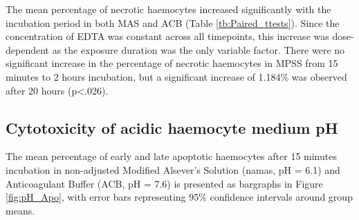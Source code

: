 The mean percentage of necrotic haemocytes increased significantly with the incubation period in both MAS and ACB (Table \ref{tb:Paired_ttests}). Since the concentration of EDTA was constant across all timepoints, this increase was dose-dependent as the exposure duration was the only variable factor. There were no significant increase in the percentage of necrotic haemocytes in MPSS from 15 minutes to 2 hours incubation, but a significant increase of 1.184\% was observed after 20 hours (p<.026).

\begin{table}[h!]
\centering
	\caption{Paired two-tailed t-tests were used to assess wether the percentages of necrotic haemocytes increased with incubation time within each group. The difference between means at t = 15 min, 2 hours and 20 hours are presented with 95\% confidence intervals and the belonging p-value.}
	\label{tb:Paired_ttests}
\end{table}


\subsection{Cytotoxicity of acidic haemocyte medium pH}
The mean percentage of early and late apoptotic haemocytes after 15 minutes incubation in non-adjusted Modified Alsever's Solution (\acrshort{namas}, pH = 6.1) and Anticoagulant Buffer (ACB, pH = 7.6) is presented as bargraphs in Figure \ref{fig:pH_Apo}, with error bars representing 95\% confidence intervals around group means. 

